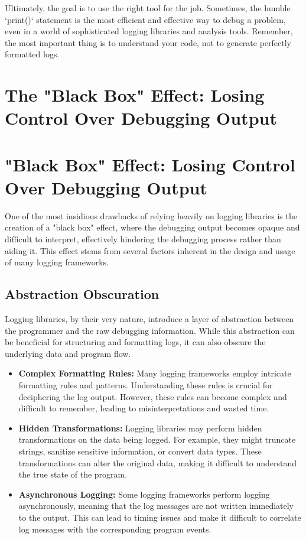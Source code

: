 \documentclass{article}
\begin{document}
{{{{Ultimately, the goal is to use the right tool for the job. Sometimes, the humble `print()` statement is the most efficient and effective way to debug a problem, even in a world of sophisticated logging libraries and analysis tools. Remember, the most important thing is to understand your code, not to generate perfectly formatted logs.

\newpage

\section*{The "Black Box" Effect: Losing Control Over Debugging Output} %
\label{chapter-7-7-The__Black_Box__Effect__Losing_Control_O}

\section*{"Black Box" Effect: Losing Control Over Debugging Output}

One of the most insidious drawbacks of relying heavily on logging libraries is the creation of a "black box" effect, where the debugging output becomes opaque and difficult to interpret, effectively hindering the debugging process rather than aiding it. This effect stems from several factors inherent in the design and usage of many logging frameworks.

\subsection*{Abstraction Obscuration}

Logging libraries, by their very nature, introduce a layer of abstraction between the programmer and the raw debugging information. While this abstraction can be beneficial for structuring and formatting logs, it can also obscure the underlying data and program flow.

\begin{itemize}
    \itemsep0em
    \item \textbf{Complex Formatting Rules:} Many logging frameworks employ intricate formatting rules and patterns. Understanding these rules is crucial for deciphering the log output. However, these rules can become complex and difficult to remember, leading to misinterpretations and wasted time.
    \item \textbf{Hidden Transformations:} Logging libraries may perform hidden transformations on the data being logged. For example, they might truncate strings, sanitize sensitive information, or convert data types. These transformations can alter the original data, making it difficult to understand the true state of the program.
    \item \textbf{Asynchronous Logging:} Some logging frameworks perform logging asynchronously, meaning that the log messages are not written immediately to the output. This can lead to timing issues and make it difficult to correlate log messages with the corresponding program events.
\end{itemize}

}}}}
\end{document}
